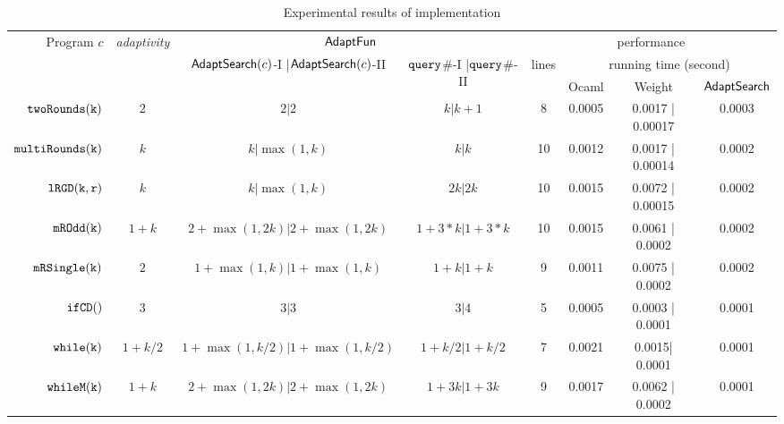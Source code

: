 {\footnotesize
\begin {table}[H]
\vspace{-0.5cm}
    \caption{Experimental results of {\THESYSTEM} implementation}
    \vspace{-0.5cm}
        \label{tb:adapt-imp}
        \begin{center}
        \centering
{\scriptsize
        \begin{tabular}{ r | c | c | c | c | c | c | c  }
        \multirow{3}{*}{Program $c$} & 
        \multirow{3}{*}{\emph{adaptivity}}
         & \multicolumn{2}{c|}{$\textsf{AdaptFun}$}
         & \multicolumn{4}{c}{performance} \\ 
         \cline{3-8}
         & & \multirow{2}{*}{$\mathsf{AdaptSearch}(c)$-I |$\mathsf{AdaptSearch}(c)$-II } & \multirow{2}{*}{${\tt query}$\#-I |${\tt query}$\#-II} & \multirow{2}{*}{lines} & \multicolumn{3}{c}{running time (second)} \\ 
         \cline{6-8}
         & & & &  & Ocaml & Weight & $\mathsf{AdaptSearch}$  \\
         \hline \hline
         $  \mathtt{twoRounds(k)}$ & $2$ &  $2| 2$ & $k| k+1$ & 8 & 0.0005 & 0.0017 | 0.00017 & 0.0003 \\
         $  \mathtt{multiRounds(k)}$ & $k$ &  $k| \max(1,k)$ & $k| k$  &  10 & 0.0012 & 0.0017 | 0.00014 & 0.0002 \\
         $  \mathtt{lRGD(k, r)}$ & $k$ & $k | \max(1,k) $ & $ 2k | 2k$  &  10 & 0.0015 & 0.0072 | 0.00015 & 0.0002  \\
         $  \mathtt{mROdd(k)}$ & $1 + k$ &  $2+\max(1,2k) | 2+\max(1,2k) $ & $1 + 3*k | 1 + 3*k$  &  10 & 0.0015 & 0.0061 | 0.0002 & 0.0002 \\
         $  \mathtt{mRSingle(k)}$    & $2$ &  $1+ \max(1, k) | 1+ \max(1, k)$ & $1 + k | 1 + k$  &  9 & 0.0011 & 0.0075 | 0.0002 & 0.0002 \\
         $  \mathtt{ifCD()}$ & $3$ & $3 | 3$ &   $3| 4$  & 5 & 0.0005 & 0.0003 | 0.0001  & 0.0001 \\
         $  \mathtt{while(k)}$ & $1+k/2$ &   $1 +\max(1, k/2) | 1 +\max(1, k/2) $  &  $1+k/2 | 1 + k/2 $ & 7 & 0.0021 & 0.0015| 0.0001 &  0.0001 \\
         $  \mathtt{whileM(k)}$ & $1 + k$ &  $ 2 + \max(1,2k) | 2 + \max(1,2k)$ & $1 + 3k | 1 + 3k$  &  9 & 0.0017 & 0.0062 | 0.0002 & 0.0001  \\

\end{tabular}}
\end{center}
\end{table}}
